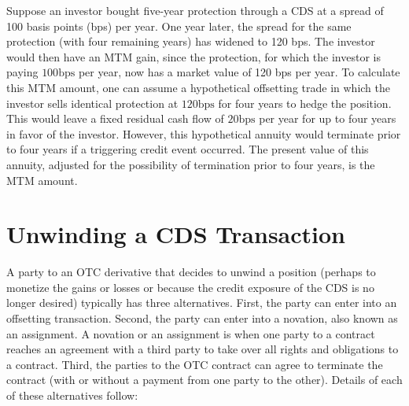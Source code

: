 \documentclass[11pt]{article}
\begin{document}
Suppose an investor bought five-year protection through a CDS at a spread of 100 basis points (bps) per year. One year later, the spread for the same protection (with four remaining years) has widened to 120 bps. The investor would then have an MTM gain, since the protection, for which the investor is paying $100 \mathrm{bps}$ per year, now has a market value of 120 bps per year. To calculate this MTM amount, one can assume a hypothetical offsetting trade in which the investor sells identical protection at $120 \mathrm{bps}$ for four years to hedge the position. This would leave a fixed residual cash flow of $20 \mathrm{bps}$ per year for up to four years in favor of the investor. However, this hypothetical annuity would terminate prior to four years if a triggering credit event occurred. The present value of this annuity, adjusted for the possibility of termination prior to four years, is the MTM amount.

\section*{Unwinding a CDS Transaction}
A party to an OTC derivative that decides to unwind a position (perhaps to monetize the gains or losses or because the credit exposure of the CDS is no longer desired) typically has three alternatives. First, the party can enter into an offsetting transaction. Second, the party can enter into a novation, also known as an assignment. A novation or an assignment is when one party to a contract reaches an agreement with a third party to take over all rights and obligations to a contract. Third, the parties to the OTC contract can agree to terminate the contract (with or without a payment from one party to the other). Details of each of these alternatives follow:
\end{document}
